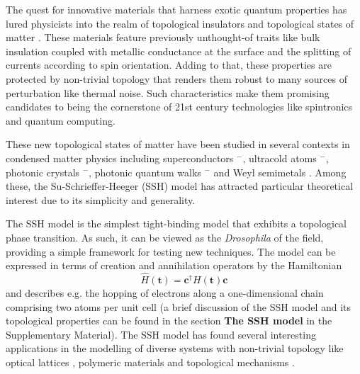 \documentclass[10pt]{revtex4-1}
\begin{document}
The quest for innovative materials that harness exotic quantum properties has lured physicists into the realm of topological insulators and topological states of matter \cite{RevModPhys.82.3045}. These materials feature previously unthought-of traits like bulk insulation coupled with metallic conductance at the surface and the splitting of currents according to spin orientation. Adding to that, these properties are protected by non-trivial topology that renders them robust to many sources of perturbation like thermal noise. Such characteristics make them promising candidates to being the cornerstone of 21st century technologies like spintronics and quantum computing.

These new topological states of matter have been studied in several contexts in condensed matter physics including superconductors \cite {CONTINENTINO2017A1}$^-$\cite{ryu2010topological}, ultracold atoms \cite{atala2013direct}$^-$\cite{meier2016observation}, photonic crystals \cite{hafezi2013imaging}$^-$\cite{PhysRevX.5.031011}, photonic quantum walks \cite{kitagawa2012observation}$^-$\cite{PhysRevX.7.031023} and Weyl semimetals \cite{soluyanov2015type,PhysRevX.5.031013}. Among these, the Su-Schrieffer-Heeger (SSH) model \cite{PhysRevLett.42.1698} has attracted particular theoretical interest due to its simplicity and generality.

The SSH model is the simplest tight-binding model that exhibits a topological phase transition. As such, it can be viewed as the \emph{Drosophila} of the field, providing a simple framework for testing new techniques. The model can be expressed in terms of creation and annihilation operators by the Hamiltonian
\begin{equation}
\label{SSH_ham}
\hat{H}(\mathbf{t})=\mathbf{c}^{\dagger}H(\mathbf{t})\mathbf{c}
\end{equation}
and describes e.g. the hopping of electrons along a one-dimensional chain comprising two atoms per unit cell (a brief discussion of the SSH model and its topological properties can be found in the section \textbf{The SSH model} in the Supplementary Material). The SSH model has found several interesting applications in the modelling of diverse systems with non-trivial topology like optical lattices \cite{maffei2018topological}, polymeric materials \cite{RevModPhys.73.681} and topological mechanisms \cite{kane2014topological,Chen13004}.
\end{document}
